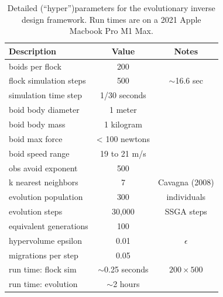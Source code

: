 \documentclass[letterpaper]{article}
\begin{document}
\begin{table}[]
\centering
\begin{tabular}{ | l | c | c | }
    \hline
    \textbf{Description} & \textbf{Value} & \textbf{Notes} \\
    \hline
    boids per flock & 200 &  \\
    flock simulation steps & 500 & $\sim$16.6 sec \\
    simulation time step & 1/30 seconds & \\
    \hline
    boid body diameter & 1 meter & \\
    boid body mass & 1 kilogram & \\
    boid max force & < 100 newtons & \\
    boid speed range & 19 to 21 m/s & \\
    obs avoid exponent & 500 & \\
    k nearest neighbors & 7 & Cavagna (2008) \\
    \hline
    evolution population & 300 & individuals \\
    evolution steps & 30,000 &  SSGA steps \\
    equivalent generations & 100 & \\
    hypervolume epsilon & 0.01 & $\epsilon$ \\
    migrations per step & 0.05 &  \\
    \hline
    run time: flock sim & $\sim$0.25 seconds & $200{\times}500$ \\
    run time: evolution & $\sim$2 hours & \\
    \hline
\end{tabular}
\caption{Detailed (``hyper'')parameters for the evolutionary inverse design framework. Run times are on a 2021 Apple Macbook Pro M1 Max.}
\label{table:HyperParameters}
\end{table}



\end{document}
